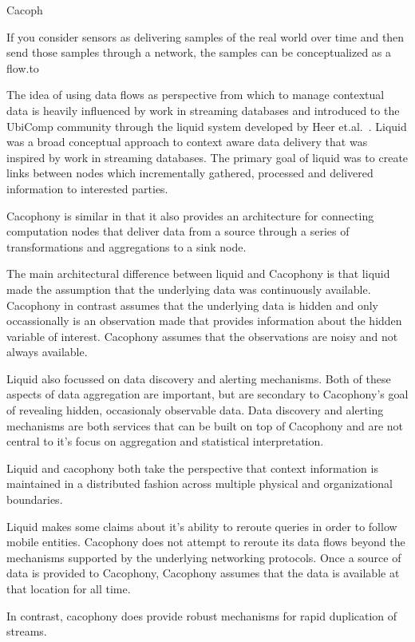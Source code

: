 Cacoph

If you consider sensors as delivering samples of the real world over time and
then send those samples through a network, the samples can be conceptualized as
a flow.to 


The idea of using data flows as perspective from which to manage contextual data
is heavily influenced by work in streaming databases and introduced to the
UbiComp community through the liquid system developed by Heer
et.al.~\cite{HeerNBH03}.  Liquid was a broad conceptual approach to context
aware data delivery that was inspired by work in streaming databases.  The
primary goal of liquid was to create links between nodes which incrementally
gathered, processed and delivered information to interested parties.

Cacophony is similar in that it also provides an architecture for connecting
computation nodes that deliver data from a source through a series of
transformations and aggregations to a sink node.

The main architectural difference between liquid and Cacophony is that liquid
made the assumption that the underlying data was continuously available.
Cacophony in contrast assumes that the underlying data is hidden and only
occassionally is an observation made that provides information about the hidden
variable of interest.  Cacophony assumes that the observations are noisy and not
always available.

Liquid also focussed on data discovery and alerting mechanisms.  Both of these
aspects of data aggregation are important, but are secondary to Cacophony's goal
of revealing hidden, occasionaly observable data.  Data discovery and alerting
mechanisms are both services that can be built on top of Cacophony and are not
central to it's focus on aggregation and statistical interpretation. 

Liquid and cacophony both take the perspective that context information is
maintained in a distributed fashion across multiple physical and organizational
boundaries.

Liquid makes some claims about it's ability to reroute queries in order to
follow mobile entities.  Cacophony does not attempt to reroute its data flows
beyond the mechanisms supported by the underlying networking protocols.  Once a
source of data is provided to Cacophony, Cacophony assumes that the data is
available at that location for all time.

In contrast, cacophony does provide robust mechanisms for rapid duplication of
streams.  

